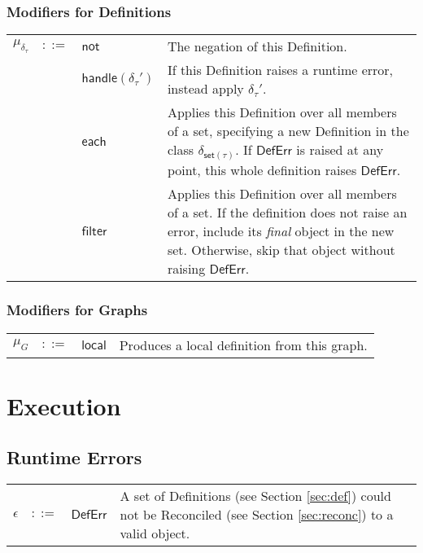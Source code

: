 \documentclass[11pt]{report}
\begin{document}
\subsection{Modifiers for Definitions}
\label{subsec:mods-defs}

\begin{tabularx}{\textwidth}{l l l X}
$\mu_{\delta_\tau}$ & $::=$ & $\mathsf{not}$ & The negation of this Definition. \\
 & & $\mathsf{handle}(\delta_\tau')$ & If this Definition raises a runtime error, instead apply $\delta_\tau'$. \\
 & & $\mathsf{each}$ & Applies this Definition over all members of a set, specifying a new Definition in the class $\delta_{\mathsf{set}(\tau)}$. If $\mathsf{DefErr}$ is raised at any point, this whole definition raises $\mathsf{DefErr}$. \\
 & & $\mathsf{filter}$ & Applies this Definition over all members of a set. If the definition does not raise an error, include its {\it final} object in the new set. Otherwise, skip that object without raising $\mathsf{DefErr}$. \\
\end{tabularx}

\subsection{Modifiers for Graphs}
\label{subsec:mods-graphs}
\begin{tabularx}{\textwidth}{l l l X}
$\mu_{G}$ & $::=$ & $\mathsf{local}$ & Produces a local definition from this graph. \\
\end{tabularx}


\chapter{Execution}
\label{chap:exec}

\section{Runtime Errors}
\label{sec:runtime-errors}

\begin{tabularx}{\textwidth}{l l l X}
$\epsilon$ & $::=$ & $\mathsf{DefErr}$ & A set of Definitions (see Section \ref{sec:def}) could not be Reconciled (see Section \ref{sec:reconc}) to a valid object.
\end{tabularx}
\end{document}
